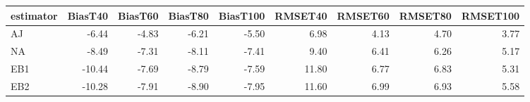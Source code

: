 \begin{table}[ht]
\centering
\begin{tabular}{lrrrrrrrr}
  \toprule
estimator & BiasT40 & BiasT60 & BiasT80 & BiasT100 & RMSET40 & RMSET60 & RMSET80 & RMSET100 \\ 
  \midrule
AJ & -6.44 & -4.83 & -6.21 & -5.50 & 6.98 & 4.13 & 4.70 & 3.77 \\ 
  NA & -8.49 & -7.31 & -8.11 & -7.41 & 9.40 & 6.41 & 6.26 & 5.17 \\ 
  EB1 & -10.44 & -7.69 & -8.79 & -7.59 & 11.80 & 6.77 & 6.83 & 5.31 \\ 
  EB2 & -10.28 & -7.91 & -8.90 & -7.95 & 11.60 & 6.99 & 6.93 & 5.58 \\ 
   \bottomrule
\end{tabular}
\end{table}
